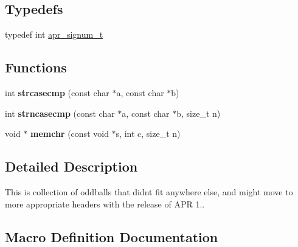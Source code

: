 \subsection*{Typedefs}
\begin{DoxyCompactItemize}
\item 
typedef int \mbox{\hyperlink{group__apr__general_gafe9e657d61b61d62ecba34299a82a7ea}{apr\+\_\+signum\+\_\+t}}
\end{DoxyCompactItemize}
\subsection*{Functions}
\begin{DoxyCompactItemize}
\item 
\mbox{\label{group__apr__general_ga4a00fc29b96a953fed9e0107a9c4548a}} 
int {\bfseries strcasecmp} (const char $\ast$a, const char $\ast$b)
\item 
\mbox{\label{group__apr__general_ga8a019f6d84acf570175ecfc8b3382170}} 
int {\bfseries strncasecmp} (const char $\ast$a, const char $\ast$b, size\+\_\+t n)
\item 
\mbox{\label{group__apr__general_ga16d6b0bd660cc3f9910924c6b6f4af8e}} 
void $\ast$ {\bfseries memchr} (const void $\ast$s, int c, size\+\_\+t n)
\end{DoxyCompactItemize}


\subsection{Detailed Description}
This is collection of oddballs that didn\textquotesingle{}t fit anywhere else, and might move to more appropriate headers with the release of A\+PR 1.. 

\subsection{Macro Definition Documentation}
\mbox{\label{group__apr__general_ga3c4f50d14ebe7a6add282d879521d552}} 
